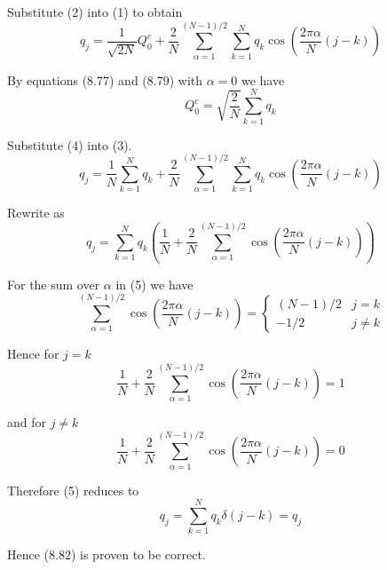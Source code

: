 \documentclass[12pt]{article}
\begin{document}
Substitute (2) into (1) to obtain
\begin{equation*}
q_j=
\frac{1}{\sqrt{2N}}Q_0^c
+
\frac{2}{N}
\sum_{\alpha=1}^{(N-1)/2}
\sum_{k=1}^N
q_k\cos\left(\frac{2\pi\alpha}{N}(j-k)\right)
\tag{3}
\end{equation*}

By equations (8.77) and (8.79) with $\alpha=0$ we have
\begin{equation*}
Q_0^c
=\sqrt{\frac{2}{N}}\sum_{k=1}^Nq_k
\tag{4}
\end{equation*}

Substitute (4) into (3).
\begin{equation*}
q_j=
\frac{1}{N}\sum_{k=1}^N q_k
+
\frac{2}{N}
\sum_{\alpha=1}^{(N-1)/2}
\sum_{k=1}^N
q_k\cos\left(\frac{2\pi\alpha}{N}(j-k)\right)
\end{equation*}

Rewrite as
\begin{equation*}
q_j=\sum_{k=1}^N q_k \left(
\frac{1}{N}+\frac{2}{N}\sum_{\alpha=1}^{(N-1)/2}
\cos\left(\frac{2\pi\alpha}{N}(j-k)\right)
\right)
\tag{5}
\end{equation*}

For the sum over $\alpha$ in (5) we have
\begin{equation*}
\sum_{\alpha=1}^{(N-1)/2}
\cos\left(\frac{2\pi\alpha}{N}(j-k)\right)
=\begin{cases}
(N-1)/2 & j=k
\\
-1/2 & j\ne k
\end{cases}
\end{equation*}

Hence for $j=k$
\begin{equation*}
\frac{1}{N}+\frac{2}{N}\sum_{\alpha=1}^{(N-1)/2}
\cos\left(\frac{2\pi\alpha}{N}(j-k)\right)
=1
\end{equation*}

and for $j\ne k$
\begin{equation*}
\frac{1}{N}+\frac{2}{N}\sum_{\alpha=1}^{(N-1)/2}
\cos\left(\frac{2\pi\alpha}{N}(j-k)\right)
=0
\end{equation*}

Therefore (5) reduces to
\begin{equation*}
q_j=\sum_{k=1}^N q_k\delta(j-k)=q_j
\end{equation*}

Hence (8.82) is proven to be correct.
\end{document}
